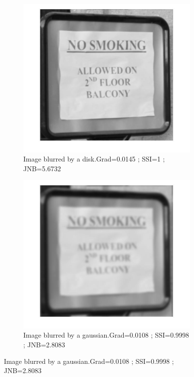 \begin{figure}[h!]
\begin{subfigure}[b]{0.3\textwidth}
        \end{subfigure}
        \begin{subfigure}[b]{0.3\textwidth}
                 \centering
                 \includegraphics[width=\textwidth]{sign_D.jpg}
                 \caption{Image blurred by a disk.\newline Grad=0.0145 ; SSI=1 ; JNB=5.6732}
                       
        \end{subfigure}
        \begin{subfigure}[b]{0.3\textwidth}
                \centering
                \includegraphics[width=\textwidth]{sign_G.jpg}
                \caption{Image blurred by a gaussian.\newline Grad=0.0108 ; SSI=0.9998 ; JNB=2.8083} 
        \end{subfigure} 
       

\end{figure}
